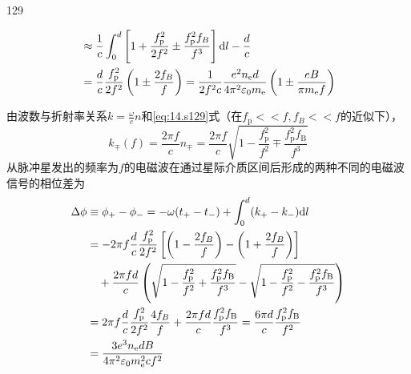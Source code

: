 \begin{solution}{129}
\begin{subsolution}
\begin{align}
            &\approx \frac {1}{c} \int_ {0} ^ {d} \left[ 1 + \frac {f _ {\mathrm{p}} ^ {2}}{2 f ^ {2}} \pm \frac {f _ {\mathrm{p}} ^ {2} f _ {B}}{f ^ {3}} \right] \mathrm{d} l - \frac {d}{c} \notag \\
            &= \frac {d}{c} \frac {f _ {\mathrm{p}} ^ {2}}{2 f ^ {2}} \left(1 \pm \frac {2 f _ {B}}{f}\right) = \frac {1}{2 f ^ {2} c} \frac {e ^ {2} n _ {\mathrm{e}} d}{4 \pi^ {2} \varepsilon_ {0} m _ {\mathrm{e}}} \left(1 \pm \frac {e B}{\pi m _ {\mathrm{e}} f}\right)
            \label{eq:21.s129}
        \end{align}
    \end{subsolution}
    \begin{subsolution}
        由波数与折射率关系$k = \frac { \omega } { c } n$和\eqref{eq:14.s129}式（在$f _ { \mathrm { p } } << f , f _ { B } << f$的近似下），
        \begin{equation}
            k _ {\mp} (f) = \frac {2 \pi f}{c} n _ {\mp} = \frac {2 \pi f}{c} \sqrt {1 - \frac {f _ {\mathrm{p}} ^ {2}}{f ^ {2}} \mp \frac {f _ {\mathrm{p}} ^ {2} f _ {\mathrm{B}}}{f ^ {3}}}
            \label{eq:22.s129}
        \end{equation}
        从脉冲星发出的频率为$f$的电磁波在通过星际介质区间后形成的两种不同的电磁波信号的相位差为
        \begin{align}
            \Delta \phi &\equiv \phi_ {+} - \phi_ {-} = - \omega (t _ {+} - t _ {-}) + \int_ {0} ^ {d} (k _ {+} - k _ {-}) \mathrm{d} l \notag \\
            &= - 2 \pi f \frac {d}{c} \frac {f _ {\mathrm{p}} ^ {2}}{2 f ^ {2}} \left[ \left(1 - \frac {2 f _ {B}}{f}\right) - \left(1 + \frac {2 f _ {B}}{f}\right) \right] \notag \\
            &\quad + \frac {2 \pi f d}{c} \left(\sqrt {1 - \frac {f _ {\mathrm{p}} ^ {2}}{f ^ {2}} + \frac {f _ {\mathrm{p}} ^ {2} f _ {\mathrm{B}}}{f ^ {3}}} - \sqrt {1 - \frac {f _ {\mathrm{p}} ^ {2}}{f ^ {2}} - \frac {f _ {\mathrm{p}} ^ {2} f _ {\mathrm{B}}}{f ^ {3}}}\right) \notag \\
            &= 2 \pi f \frac {d}{c} \frac {f _ {\mathrm{p}} ^ {2}}{2 f ^ {2}} \frac {4 f _ {B}}{f} + \frac {2 \pi f d}{c} \frac {f _ {\mathrm{p}} ^ {2} f _ {\mathrm{B}}}{f ^ {3}} = \frac {6 \pi d}{c} \frac {f _ {\mathrm{p}} ^ {2} f _ {\mathrm{B}}}{f ^ {2}} \notag \\
            &= \frac {3 e ^ {3} n _ {\mathrm{e}} d B}{4 \pi^ {2} \varepsilon_ {0} m _ {\mathrm{e}} ^ {2} c f ^ {2}}
            \label{eq:23.s129}
        \end{align}

\end{subsolution}
\end{solution}
